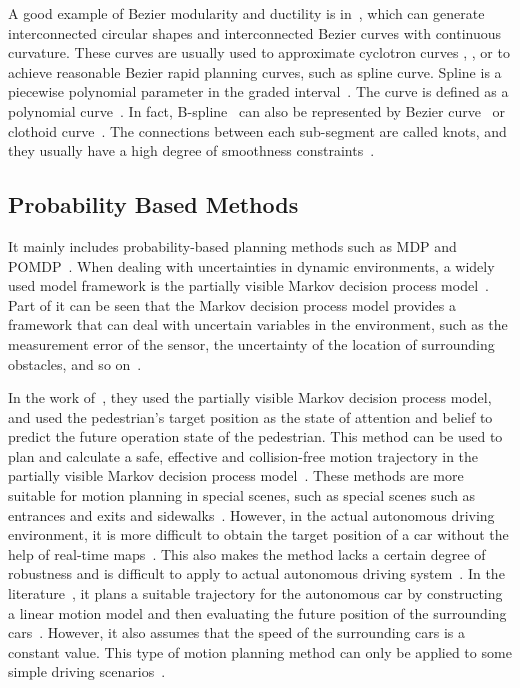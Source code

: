 \documentclass[conference]{IEEEtran}
\begin{document}
A good example of Bezier modularity and ductility is in~\cite{setsompop2012blipped}, which can generate interconnected circular shapes and interconnected Bezier curves with continuous curvature. These curves are usually used to approximate cyclotron curves \cite{wang2001approximation}, \cite{sanchez2003polynomial}, or to achieve reasonable Bezier rapid planning curves, such as spline curve. Spline is a piecewise polynomial parameter in the graded interval~\cite{montes2008real}. The curve is defined as a polynomial curve~\cite{piazzi2002quintic}. In fact, B-spline~\cite{shiller1991dynamic, berglund2009planning} can also be represented by Bezier curve~\cite{elbanhawi2014sampling} or clothoid curve~\cite{walton2005controlled}. The connections between each sub-segment are called knots, and they usually have a high degree of smoothness constraints~\cite{elbanhawi2014sampling, walton2005controlled}.

\subsection{Probability Based Methods}
It mainly includes probability-based planning methods such as MDP and POMDP~\cite{Brian2016}. When dealing with uncertainties in dynamic environments, a widely used model framework is the partially visible Markov decision process model~\cite{Brian2016}. Part of it can be seen that the Markov decision process model provides a framework that can deal with uncertain variables in the environment, such as the measurement error of the sensor, the uncertainty of the location of surrounding obstacles, and so on~\cite{Brian2016}.

In the work of~\cite{bansal2018collaborative, luo2018porca, bai2015intention}, they used the partially visible Markov decision process model, and used the pedestrian's target position as the state of attention and belief to predict the future operation state of the pedestrian. This method can be used to plan and calculate a safe, effective and collision-free motion trajectory in the partially visible Markov decision process model~\cite{bansal2018collaborative, luo2018porca, bai2015intention}. These methods are more suitable for motion planning in special scenes, such as special scenes such as entrances and exits and sidewalks~\cite{bansal2018collaborative, luo2018porca, bai2015intention}. However, in the actual autonomous driving environment, it is more difficult to obtain the target position of a car without the help of real-time maps~\cite{bansal2018collaborative, luo2018porca, bai2015intention}. This also makes the method lacks a certain degree of robustness and is difficult to apply to actual autonomous driving system~\cite{bansal2018collaborative, luo2018porca, bai2015intention}.  In the literature~\cite{brechtel2014probabilistic}, it plans a suitable trajectory for the autonomous car by constructing a linear motion model and then evaluating the future position of the surrounding cars~\cite{brechtel2014probabilistic}. However, it also assumes that the speed of the surrounding cars is a constant value. This type of motion planning method can only be applied to some simple driving scenarios~\cite{brechtel2014probabilistic}.
\end{document}
